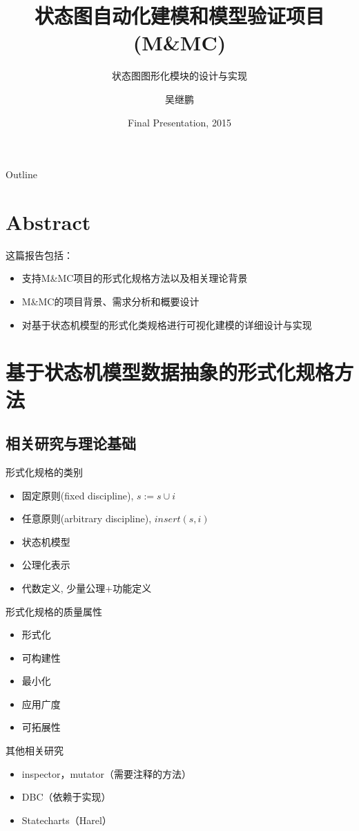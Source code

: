 \documentclass{beamer}
\title[南京大学本科毕业设计] 
{状态图自动化建模和模型验证项目(M\&MC)}
\subtitle
{状态图图形化模块的设计与实现}
\author[Author] 
{吴继鹏}
\institute[Universities of Somewhere and Elsewhere] 
{
  南京大学软件学院\\
  规格技术研究小组
}
\date[AFP 2003]
{Final Presentation, 2015}
\begin{document}
\begin{frame}
  \titlepage
\end{frame}

\begin{frame}{Outline}
  \tableofcontents
\end{frame}

\section{Abstract}
\begin{frame}{这篇报告包括：}
  \begin{itemize}
  \item 支持M\&MC项目的形式化规格方法以及相关理论背景 \pause
  \item M\&MC的项目背景、需求分析和概要设计 \pause
  \item 对基于状态机模型的形式化类规格进行可视化建模的详细设计与实现 \pause
  \end{itemize}
\end{frame}  

\section{基于状态机模型数据抽象的形式化规格方法}
\subsection{相关研究与理论基础}
\begin{frame}{形式化规格的类别}
  \begin{itemize}
  \item 固定原则(fixed discipline), $s := s∪i$  \pause
  \item 任意原则(arbitrary discipline), $insert(s,i)$  \pause
  \item 状态机模型 \pause
  \item 公理化表示 \pause
  \item 代数定义, 少量公理+功能定义 \pause
  \end{itemize}
\end{frame}  
\begin{frame}{形式化规格的质量属性}
  \begin{itemize}
  \item 形式化 \pause
  \item 可构建性 \pause
  \item 最小化 \pause
  \item 应用广度 \pause
  \item 可拓展性 \pause
  \end{itemize}
\end{frame}  
\begin{frame}{其他相关研究}
  \begin{itemize}
  \item inspector，mutator（需要注释的方法） \pause
  \item DBC（依赖于实现） \pause
  \item Statecharts（Harel） \pause
  \end{itemize}
\end{frame}  
\end{document}

